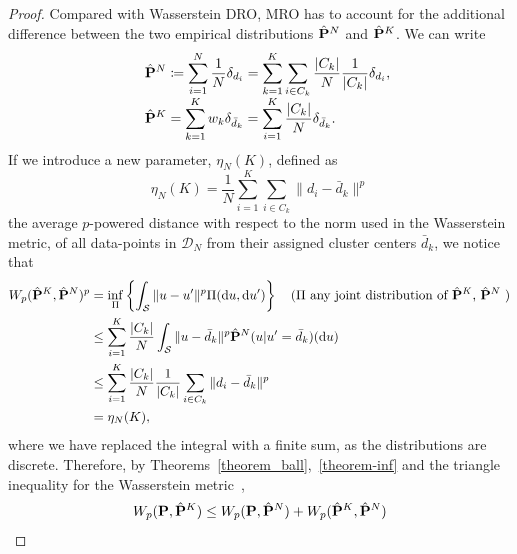 \documentclass[12pt]{article}
\theoremstyle{thmstyleone}%
\theoremstyle{thmstyletwo}%
\theoremstyle{thmstylethree}%
\newcommand{\reviewChanges}{}
\begin{document}
\begin{proof}
Compared with Wasserstein \gls{DRO}, \gls{MRO} has to account for the additional difference between the two empirical distributions $\hat{{\mathbf P}}^N$ and $\hat{{\mathbf P}}^K$.
We can write
\begin{equation*}
	\begin{array}{ll}
		&\displaystyle \hat{\prob}^N \define \sum_{i=1}^N \frac{1}{N}\delta_{d_i} = \sum_{k=1}^K \sum_{i \in C_k} \frac{|C_k|}{N}\frac{1}{|C_k|}   \delta_{d_i}, \\ %
		&\displaystyle \hat{\prob}^K = \sum_{k=1}^K w_k\delta_{\bar{d}_k} = \sum_{i=1}^K \frac{|C_k|}{N}\delta_{\bar{d}_k}. %
		\end{array}
	\end{equation*}
If we introduce a new parameter, $\eta_N(K)$, defined as
\begin{equation*}
	\eta_N(K) =  \frac{1}{N} \sum_{i = 1}^K \sum_{i \in C_k} \|d_i - \bar{d}_k\|^p
	\end{equation*}
	 the average $p$-powered distance with respect to the norm used in the Wasserstein metric, of all data-points in $\mathcal{D}_N$ from their assigned cluster centers $\bar{d}_k$, we notice that
\begin{equation*}
	\begin{aligned}
	W_p(\hat{\prob}^K,\hat{\prob}^N)^p &= \inf_\Pi \left\{ \int_\reviewChanges{\supp} \|u - u'\|^p \Pi (\dif u,\dif u') \right\} \quad \text{($\Pi$ any joint distribution of $\hat{\prob}^K$, $\hat{\prob}^N$  )}\\
&\leq \sum_{i = 1}^K \frac{|C_k|}{N}  \int_\reviewChanges{\supp} \|u - \bar{d}_k\|^p \reviewChanges{\hat{\prob}^N(u|u' =\bar{d}_k)}({\rm d}u)\\
&\leq \sum_{i = 1}^K \frac{|C_k|}{N}  \frac{1}{|C_k|} \sum_{i \in C_k} \|d_i - \bar{d}_k\|^p\\
&= \eta_N(K),
	\end{aligned}
	\end{equation*}
where we have replaced the integral with a finite sum, as the distributions are discrete. Therefore, by Theorems~\ref{theorem_ball},~\ref{theorem-inf} and the \reviewChanges{triangle inequality for the Wasserstein metric~\cite{wass_tri}},
\begin{equation*}
	\begin{aligned}
	W_p(\prob,\hat{\prob}^K) &\leq W_p(\prob,\hat{\prob}^N) + W_p(\hat{\prob}^K,\hat{\prob}^N)\\

\end{aligned}
\end{equation*}
\end{proof}
\end{document}
